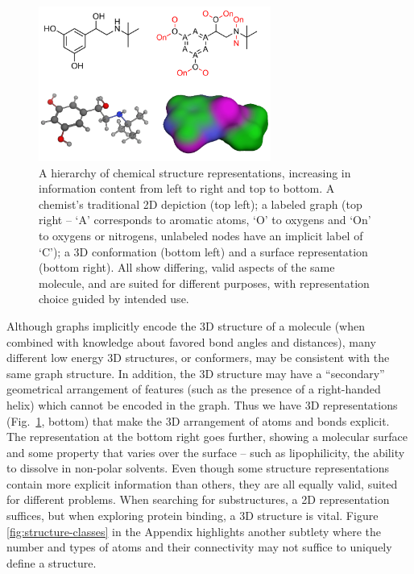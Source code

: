 \documentclass{../sig-alternate}
\begin{document}
\begin{figure}
\centering
\includegraphics[height=2in]{chemical-structures.png}
\caption{A hierarchy of chemical structure representations, increasing
  in information content from left to right and top to bottom. A
  chemist's traditional 2D depiction (top left); a labeled graph (top
  right -- `A' corresponds to aromatic atoms, `O' to oxygens and `On' to
  oxygens or nitrogens, unlabeled nodes have an implicit label of `C'); a 3D
  conformation (bottom left) and a surface representation (bottom right). All show differing,
  valid aspects of the same molecule, and are suited for
  different purposes, with representation choice guided by
  intended use.}
\label{figure:chemical-structures}
\end{figure}

Although graphs implicitly encode the 3D structure of a molecule (when
combined with knowledge about favored bond angles and distances), many
different low energy 3D structures, or conformers, may be consistent
with the same graph structure. In addition, the 3D structure may have
a ``secondary'' geometrical arrangement of features (such as the
presence of a right-handed helix) which cannot be encoded in the
graph. Thus we have 3D representations
(Fig.~\ref{figure:chemical-structures}, bottom) that make the 3D arrangement
of atoms and bonds explicit. The representation at the bottom right 
goes further, showing a molecular surface and some
property that varies over the surface -- such as lipophilicity, the ability to dissolve in non-polar
solvents.
Even though some structure representations contain more explicit
information than others, they are all equally valid,  suited for
different problems. When searching for substructures, a 2D
representation suffices, but when exploring protein binding, a 3D
structure is vital. Figure \ref{fig:structure-classes} in the Appendix
highlights another subtlety where the number and types of atoms
and their connectivity may not suffice to uniquely define a
structure.
\end{document}

